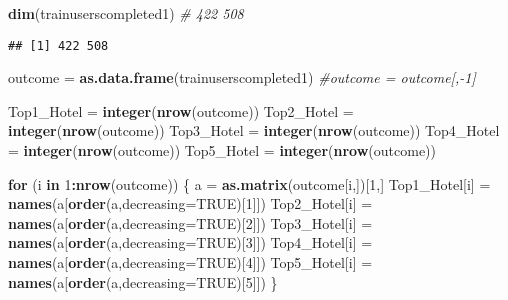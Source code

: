 \documentclass[]{article}
\newenvironment{Shaded}{\begin{snugshade}}{\end{snugshade}}
\newcommand{\CommentTok}[1]{\textcolor[rgb]{0.56,0.35,0.01}{\textit{#1}}}
\newcommand{\ControlFlowTok}[1]{\textcolor[rgb]{0.13,0.29,0.53}{\textbf{#1}}}
\newcommand{\DataTypeTok}[1]{\textcolor[rgb]{0.13,0.29,0.53}{#1}}
\newcommand{\DecValTok}[1]{\textcolor[rgb]{0.00,0.00,0.81}{#1}}
\newcommand{\KeywordTok}[1]{\textcolor[rgb]{0.13,0.29,0.53}{\textbf{#1}}}
\newcommand{\NormalTok}[1]{#1}
\newcommand{\OperatorTok}[1]{\textcolor[rgb]{0.81,0.36,0.00}{\textbf{#1}}}
\newcommand{\OtherTok}[1]{\textcolor[rgb]{0.56,0.35,0.01}{#1}}
\newcommand{\StringTok}[1]{\textcolor[rgb]{0.31,0.60,0.02}{#1}}
\begin{document}
\begin{Shaded}
\begin{Highlighting}[]
\KeywordTok{dim}\NormalTok{(trainuserscompleted1) }\CommentTok{# 422 508}
\end{Highlighting}
\end{Shaded}

\begin{verbatim}
## [1] 422 508
\end{verbatim}

\begin{Shaded}
\begin{Highlighting}[]
\NormalTok{outcome =}\StringTok{ }\KeywordTok{as.data.frame}\NormalTok{(trainuserscompleted1)}
\CommentTok{#outcome = outcome[,-1]}

\NormalTok{Top1_Hotel =}\StringTok{ }\KeywordTok{integer}\NormalTok{(}\KeywordTok{nrow}\NormalTok{(outcome))}
\NormalTok{Top2_Hotel =}\StringTok{ }\KeywordTok{integer}\NormalTok{(}\KeywordTok{nrow}\NormalTok{(outcome))}
\NormalTok{Top3_Hotel =}\StringTok{ }\KeywordTok{integer}\NormalTok{(}\KeywordTok{nrow}\NormalTok{(outcome))}
\NormalTok{Top4_Hotel =}\StringTok{ }\KeywordTok{integer}\NormalTok{(}\KeywordTok{nrow}\NormalTok{(outcome))}
\NormalTok{Top5_Hotel =}\StringTok{ }\KeywordTok{integer}\NormalTok{(}\KeywordTok{nrow}\NormalTok{(outcome))}

\ControlFlowTok{for}\NormalTok{ (i }\ControlFlowTok{in} \DecValTok{1}\OperatorTok{:}\KeywordTok{nrow}\NormalTok{(outcome)) \{}
\NormalTok{  a =}\StringTok{ }\KeywordTok{as.matrix}\NormalTok{(outcome[i,])[}\DecValTok{1}\NormalTok{,]}
\NormalTok{  Top1_Hotel[i] =}\StringTok{ }\KeywordTok{names}\NormalTok{(a[}\KeywordTok{order}\NormalTok{(a,}\DataTypeTok{decreasing=}\OtherTok{TRUE}\NormalTok{)[}\DecValTok{1}\NormalTok{]])}
\NormalTok{  Top2_Hotel[i] =}\StringTok{ }\KeywordTok{names}\NormalTok{(a[}\KeywordTok{order}\NormalTok{(a,}\DataTypeTok{decreasing=}\OtherTok{TRUE}\NormalTok{)[}\DecValTok{2}\NormalTok{]])}
\NormalTok{  Top3_Hotel[i] =}\StringTok{ }\KeywordTok{names}\NormalTok{(a[}\KeywordTok{order}\NormalTok{(a,}\DataTypeTok{decreasing=}\OtherTok{TRUE}\NormalTok{)[}\DecValTok{3}\NormalTok{]])}
\NormalTok{  Top4_Hotel[i] =}\StringTok{ }\KeywordTok{names}\NormalTok{(a[}\KeywordTok{order}\NormalTok{(a,}\DataTypeTok{decreasing=}\OtherTok{TRUE}\NormalTok{)[}\DecValTok{4}\NormalTok{]])}
\NormalTok{  Top5_Hotel[i] =}\StringTok{ }\KeywordTok{names}\NormalTok{(a[}\KeywordTok{order}\NormalTok{(a,}\DataTypeTok{decreasing=}\OtherTok{TRUE}\NormalTok{)[}\DecValTok{5}\NormalTok{]])}
\NormalTok{\}}


\end{Highlighting}
\end{Shaded}
\end{document}
